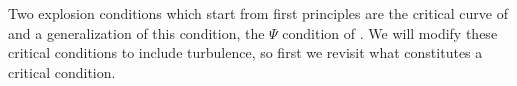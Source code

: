 \documentclass[twocolumn]{aastex6}
\begin{document}



  Two explosion conditions which start from first
  principles are the critical curve of \citet{burrows93} and
  a generalization of this condition, the
  $\Psi$ condition of \citet{murphy17}. We will modify these critical
  conditions to include turbulence, so first we revisit what constitutes
  a critical condition. 
\end{document}
